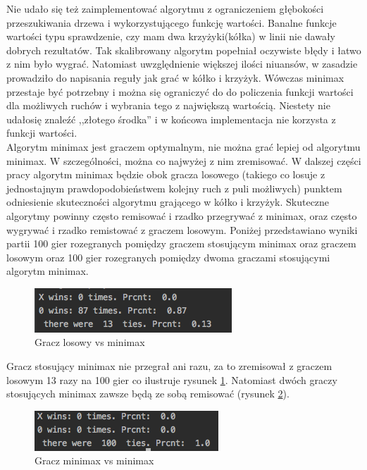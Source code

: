 \documentclass[licencjacka]{pracamgr}
\begin{document}
Nie udało się też zaimplementować algorytmu z ograniczeniem głębokości przeszukiwania drzewa i wykorzystującego funkcję wartości. Banalne funkcje wartości typu sprawdzenie,  czy mam dwa krzyżyki(kółka) w linii nie dawały dobrych rezultatów. Tak skalibrowany algorytm popełniał oczywiste błędy i łatwo z nim było wygrać.  Natomiast uwzględnienie większej ilości niuansów, w zasadzie prowadziło do napisania reguły jak grać w kółko i krzyżyk. Wówczas minimax przestaje być potrzebny i można się ograniczyć do do policzenia funkcji wartości dla możliwych ruchów i wybrania tego z największą wartością. Niestety nie udałosię znaleźć ,,złotego środka'' i w końcowa implementacja nie korzysta z funkcji wartości. \\

Algorytm minimax jest graczem optymalnym, nie można grać lepiej od algorytmu minimax. W szczególności, można co najwyżej z nim zremisować. W dalszej części pracy algorytm minimax będzie obok gracza losowego (takiego co losuje z jednostajnym prawdopodobieństwem kolejny ruch z puli możliwych) punktem odniesienie skuteczności algorytmu grającego w kółko i krzyżyk. Skuteczne algorytmy powinny często remisować i rzadko przegrywać z minimax, oraz często wygrywać i rzadko remistować z graczem losowym. Poniżej przedstawiano wyniki partii 100 gier rozegranych pomiędzy graczem stosującym minimax oraz graczem losowym  oraz 100 gier rozegranych pomiędzy dwoma graczami stosującymi algorytm minimax.\\ 

\begin{figure}[h!]
	\includegraphics [scale=0.6] {random_minimax.png}
	\caption{Gracz losowy vs minimax}
	\label{Rys5}
\end{figure}

Gracz stosujący minimax nie przegrał ani razu, za to zremisował z graczem losowym 13 razy na 100 gier co ilustruje rysunek \ref{Rys5}. 
Natomiast dwóch graczy stosujących minimax zawsze będą ze sobą remisować (rysunek \ref{Rys6}). 

\begin{figure}[h!]
	\includegraphics [scale=0.6] {minimax_minimax.png}
	\caption{Gracz minimax vs minimax}
	\label{Rys6}
\end{figure}
\end{document}
